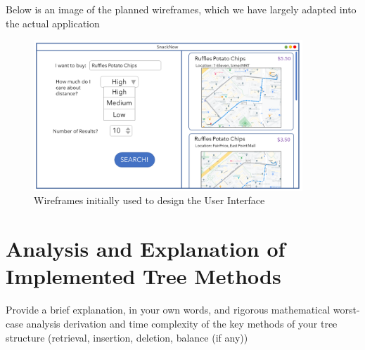 \documentclass[12pt]{article}
\begin{document}
{Below is an image of the planned wireframes, which we have largely adapted into the actual application

\begin{figure}[H]
    \centering
    \includegraphics[width=0.9\textwidth]{img/wireframe.png}
    \caption{Wireframes initially used to design the User Interface}
    \label{fig:wireframes}
\end{figure}

\section{Analysis and Explanation of Implemented Tree Methods}

Provide a brief explanation, in your own words, and rigorous mathematical worst-case
analysis derivation and time complexity of the key methods of your tree structure
(retrieval, insertion, deletion, balance (if any))



}
\end{document}

